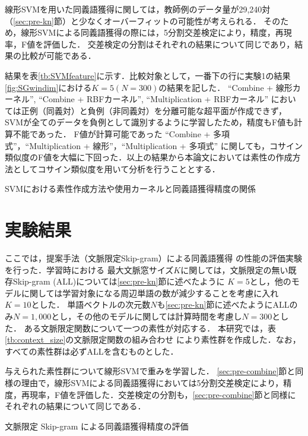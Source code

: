 \documentclass[japanese]{jnlp_1.4}
\begin{document}
線形SVMを用いた同義語獲得に関しては，教師例のデータ量が29,240対（\ref{sec:pre-kn}節）と少なくオーバーフィットの可能性が考えられる．
そのため，線形SVMによる同義語獲得の際には，5分割交差検定により，精度，再現率，F値を評価した．
交差検定の分割はそれぞれの結果について同じであり，結果の比較が可能である．

結果を表\ref{tb:SVMfeature}に示す．比較対象として，一番下の行に実験1の結果\ref{fig:SGwindim}における$K=5 (N=300)$の結果を記した．
``Combine + 線形カーネル'', ``Combine + RBFカーネル'', ``Multiplication + RBFカーネル'' においては正例（同義対）と負例（非同義対）を分離可能な超平面が作成できず，SVMが全てのデータを負例として識別するように学習したため，精度もF値も計算不能であった．
F値が計算可能であった ``Combine + 多項式''，``Multiplication + 線形''，``Multiplication + 多項式'' に関しても，コサイン類似度のF値を大幅に下回った．以上の結果から本論文においては素性の作成方法としてコサイン類似度を用いて分析を行うこととする．

\begin{table}[t]
\caption{SVMにおける素性作成方法や使用カーネルと同義語獲得精度の関係}
\label{tb:SVMfeature}

\end{table}


\section{実験結果}
\label{sec:experiment}

ここでは，提案手法（文脈限定Skip-gram）による同義語獲得
の性能の評価実験を行った．学習時における
最大文脈窓サイズ$K$に関しては，文脈限定の無い既存Skip-gram (ALL)については\ref{sec:pre-kn}節に述べたように
$K=5$とし，他のモデルに関しては学習対象になる周辺単語の数が減少することを考慮に入れ$K=10$とした．
単語ベクトルの次元数$N$も\ref{sec:pre-kn}節に述べたようにALLのみ$N=1,000$とし，その他のモデルに関しては計算時間を考慮し$N=300$とした．
ある文脈限定関数について一つの素性が対応する．
本研究では，表\ref{tb:context_size}の文脈限定関数の組み合わせ
により素性群を作成した．なお，すべての素性群は必ずALLを含むものとした．

与えられた素性群について線形SVMで重みを学習した．
\ref{sec:pre-combine}節と同様の理由で，線形SVMによる同義語獲得においては5分割交差検定により，精度，再現率，F値を評価した．交差検定の分割も，\ref{sec:pre-combine}節と同様にそれぞれの結果について同じである．

\begin{table}[b]
\caption{文脈限定 Skip-gram による同義語獲得精度の評価} 
\label{tb:proposed-result}

\end{table}
\end{document}
